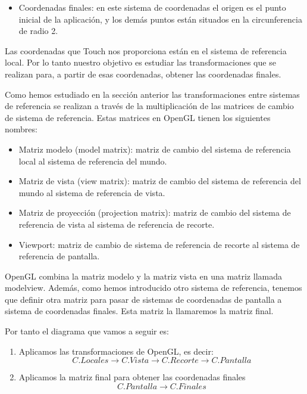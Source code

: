 \documentclass[a4paper,11pt, oneside]{book}
\begin{document}
\begin{itemize}
	\item Coordenadas finales: en este sistema de coordenadas el origen es el punto inicial de la aplicación, y los demás puntos están situados en la circunferencia de radio 2.
\end{itemize}



Las coordenadas que Touch nos proporciona están en el sistema de referencia local. Por lo tanto nuestro objetivo es estudiar las transformaciones que se realizan para, a partir de esas coordenadas, obtener las coordenadas finales.

Como hemos estudiado en la sección anterior las transformaciones entre sistemas de referencia se realizan a través de la multiplicación de las matrices de cambio de sistema de referencia. Estas matrices en OpenGL tienen los siguientes nombres:

\begin{itemize}
	\item Matriz modelo (model matrix): matriz de cambio del sistema de referencia local al sistema de referencia del mundo.
	\item Matriz de vista (view matrix): matriz de cambio del sistema de referencia del mundo al sistema de referencia de vista.
	\item Matriz de proyección (projection matrix): matriz de cambio del sistema de referencia de vista al sistema de referencia de recorte.
	\item Viewport: matriz de cambio de sistema de referencia de recorte al sistema de referencia de pantalla.
\end{itemize}

 OpenGL combina la matriz modelo y la matriz vista en una matriz llamada modelview. Además, como hemos introducido otro sistema de referencia, tenemos que definir otra matriz para pasar de sistemas de coordenadas de pantalla a sistema de coordenadas finales. Esta matriz la llamaremos la matriz final.

Por tanto el diagrama que vamos a seguir es:

\begin{enumerate}
	\item Aplicamos las transformaciones de OpenGL, es decir:
	\begin{equation}
	C. Locales \rightarrow C. Vista \rightarrow C.Recorte \rightarrow C.Pantalla
	\end{equation}
	\item Aplicamos la matriz final para obtener las coordenadas finales
	\begin{equation}
		C.Pantalla \rightarrow C.Finales
	\end{equation}
\end{enumerate}
\end{document}
